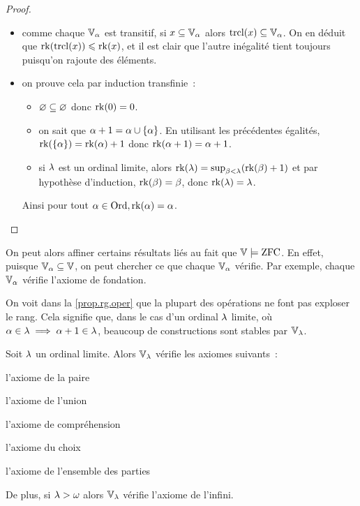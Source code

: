 \begin{proof}
\begin{itemize}
    $\rk(y) \leq \rk(x)$ par un point précédent. On en déduit que
    $\sup_{y\in \powerset(x)} (\rk(y) + 1) \leq \rk(x) + 1$ d'où
    l'égalité.
  \item comme chaque $\mathbb V_{\alpha}$ est transitif, si $x\subseteq \mathbb V_{\alpha}$ alors
    $\operatorname{trcl}(x)\subseteq \mathbb V_{\alpha}$. On en déduit que $\operatorname{rk}(\operatorname{trcl}(x)) \leqslant \operatorname{rk}(x)$, et
    il est clair que l'autre inégalité tient toujours puisqu'on rajoute des
    éléments.
  \item on prouve cela par induction transfinie~:
    \begin{itemize}
    \item $\varnothing \subseteq \varnothing$ donc $\operatorname{rk}(0) = 0$.
    \item on sait que $\alpha + 1 = \alpha \cup \{\alpha\}$. En utilisant les
      précédentes égalités, $\operatorname{rk}(\{\alpha\}) = \operatorname{rk}(\alpha) + 1$ donc
      $\operatorname{rk}(\alpha + 1) = \alpha + 1$.
    \item si $\lambda$ est un ordinal limite, alors
      $\operatorname{rk}(\lambda) = \sup_{\beta < \lambda} (\operatorname{rk}(\beta) + 1)$ et par hypothèse
      d'induction, $\operatorname{rk}(\beta) = \beta$, donc $\operatorname{rk}(\lambda) = \lambda$.
    \end{itemize}
    Ainsi pour tout $\alpha \in \operatorname{Ord}, \operatorname{rk}(\alpha) = \alpha$.\qedhere
  \end{itemize}
\end{proof}

On peut alors affiner certains résultats liés au fait que
$\mathbb V \models \operatorname{ZFC}$. En effet, puisque $\mathbb V_{\alpha} \subseteq\mathbb V$, on peut chercher ce
que chaque $\mathbb V_{\alpha}$ vérifie. Par exemple, chaque $\mathbb V_{\alpha}$ vérifie l'axiome de
fondation.

On voit dans la \cref{prop.rg.oper} que la plupart des opérations ne font pas
exploser le rang. Cela signifie que, dans le cas d'un ordinal $\lambda$ limite,
où $\alpha \in \lambda \implies \alpha + 1 \in \lambda$, beaucoup de constructions
sont stables par $\mathbb V_{\lambda}$.

\begin{property}
  Soit $\lambda$ un ordinal limite. Alors $\mathbb V_\lambda$ vérifie les
  axiomes suivants~:

  \vspace{5pt}
  \begin{itemize}
    \begin{minipage}{0.45\textwidth}
    \item l'axiome de la paire
    \item l'axiome de l'union
    \end{minipage}
    \begin{minipage}{0.45\textwidth}
    \item l'axiome de compréhension
    \item l'axiome du choix
    \end{minipage}
    \vspace{0.15cm}
  \item l'axiome de l'ensemble des parties
  \end{itemize}

  De plus, si $\lambda > \omega$ alors $\mathbb V_\lambda$ vérifie l'axiome de l'infini.
\end{property}

